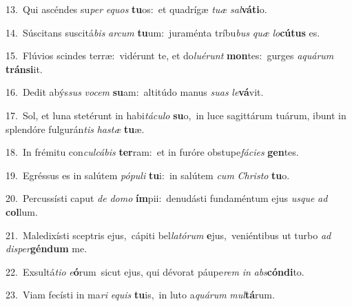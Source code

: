 {\numbfont\textcolor{\numbcolor}{13.}}~Qui ascéndes su\textit{per} \textit{e}\-\textit{quos} \textbf{tu}\-os:~\star et quadrígæ \textit{tu}\-\textit{æ} \textit{sal}\-\textbf{vá}\textbf{ti}o.\par
{\numbfont\textcolor{\numbcolor}{14.}}~Súscitans suscitá\textit{bis} \textit{ar}\-\textit{cum} \textbf{tu}\-um:~\star juraménta tríbu\textit{bus} \textit{quæ} \textit{lo}\-\textbf{cú}\textbf{tus} es.\par
{\numbfont\textcolor{\numbcolor}{15.}}~Flúvios scindes terræ:~\dagger vidérunt te, et do\-\textit{lu}\-\textit{é}\textit{runt} \textbf{mon}\-tes:~\star gurges \textit{a}\-\textit{quá}\textit{rum} \textbf{tráns}\-\textbf{i}it.\par
{\numbfont\textcolor{\numbcolor}{16.}}~Dedit abýs\textit{sus} \textit{vo}\-\textit{cem} \textbf{su}\-am:~\star altitúdo manus \textit{su}\-\textit{as} \textit{le}\-\textbf{vá}vit.\par
{\numbfont\textcolor{\numbcolor}{17.}}~Sol, et luna stetérunt in habi\-\textit{tá}\-\textit{cu}\textit{lo} \textbf{su}\-o,~\star in luce sagittárum tuárum, ibunt in splendóre fulgurán\textit{tis} \textit{has}\-\textit{tæ} \textbf{tu}\-æ.\par
{\numbfont\textcolor{\numbcolor}{18.}}~In frémitu con\-\textit{cul}\-\textit{cá}\textit{bis} \textbf{ter}\-ram:~\star et in furóre obstupe\-\textit{fá}\-\textit{ci}\textit{es} \textbf{gen}\-tes.\par
{\numbfont\textcolor{\numbcolor}{19.}}~Egréssus es in salútem \textit{pó}\-\textit{pu}\textit{li} \textbf{tu}\-i:~\star in salútem \textit{cum} \textit{Chris}\-\textit{to} \textbf{tu}\-o.\par
{\numbfont\textcolor{\numbcolor}{20.}}~Percussísti caput \textit{de} \textit{do}\-\textit{mo} \textbf{ím}\-pii:~\star denudásti fundaméntum ejus \textit{us}\-\textit{que} \textit{ad} \textbf{col}\-lum.\par
{\numbfont\textcolor{\numbcolor}{21.}}~Maledixísti sceptris ejus,~\dagger cápiti bel\-\textit{la}\-\textit{tó}\textit{rum} \textbf{e}\-jus,~\star veniéntibus ut turbo \textit{ad} \textit{di}\-\textit{sper}\textbf{gén}\textbf{dum} me.\par
{\numbfont\textcolor{\numbcolor}{22.}}~Exsultá\-\textit{ti}\-\textit{o} \textit{e}\-\textbf{ó}rum~\star sicut ejus, qui dévorat páupe\textit{rem} \textit{in} \textit{abs}\-\textbf{cón}\textbf{di}to.\par
{\numbfont\textcolor{\numbcolor}{23.}}~Viam fecísti in ma\textit{ri} \textit{e}\-\textit{quis} \textbf{tu}\-is,~\star in luto a\-\textit{quá}\-\textit{rum} \textit{mul}\-\textbf{tá}rum.\par
